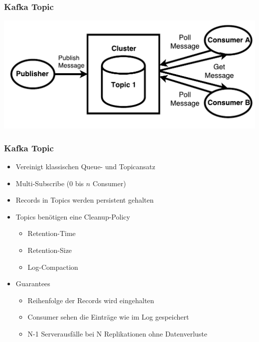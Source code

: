 \begin{frame}
\frametitle{Kafka Topic}
\centering
\includegraphics[scale=0.6]{figure/Kafka_topic_draw_Poll.pdf}
\end{frame}

\begin{frame}
\frametitle{Kafka Topic}
\begin{itemize}
	\item Vereinigt klassischen Queue- und Topicansatz
	\item Multi-Subscribe ($0$ bis $n$ Consumer)		%
	\item Records in Topics werden persistent gehalten
	\item Topics benötigen eine Cleanup-Policy
		\begin{itemize}
			\item Retention-Time
			\item Retention-Size
			\item Log-Compaction
		\end{itemize}
	\item Guarantees
		\begin{itemize}
			\item Reihenfolge der Records wird eingehalten
			\item Consumer sehen die Einträge wie im Log gespeichert
			\item N-1 Serverausfälle bei N Replikationen ohne Datenverluste
		\end{itemize}
\end{itemize}
\end{frame}

